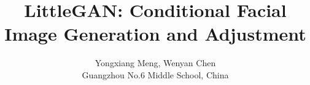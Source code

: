 \documentclass[journal,12pt,a4paper,compsoc,onecolumn]{IEEEtran}
\begin{document}
\title{LittleGAN: Conditional Facial Image Generation and Adjustment}
\author{Yongxiang Meng, Wenyan Chen\\Guangzhou No.6 Middle School, China}
\hypersetup{
	pdftitle=LittleGAN: Conditional Facial Image Generation and Adjustment,
	pdfauthor=Yongxiang Meng\, Wenyan Chen
}






\maketitle

\newpage
\tableofcontents
\newpage







\newpage
{}





\end{document}
